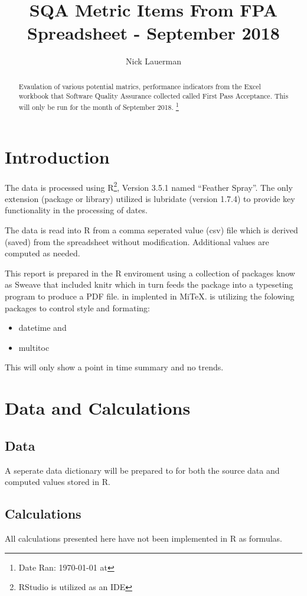 \documentclass{article}
\title{SQA Metric Items From FPA Spreadsheet - September 2018}
\author{Nick Lauerman}
\date{}
\begin{document}

\maketitle

\begin{abstract}
Evaulation of various potential matrics, performance indicators from the Excel
workbook that Software Quality Assurance collected called First Pass
Acceptance. This will only be run for the month of September 2018.
\footnote{Date Ran: \today{} at \currenttime}
\end{abstract}

\tableofcontents

\section{Introduction}
The data is processed using R\footnote{RStudio is utilized as an IDE}, Version
3.5.1 named ``Feather Spray''. The only extension (package or library) utilized is
lubridate (version 1.7.4) to provide key functionality in the processing of dates.

The data is read into R from a comma seperated value (csv) file which is derived (saved)
from the spreadsheet without modification. Additional values are computed as needed.

This report is prepared in the R enviroment using a collection of packages know as
Sweave that included knitr which in turn feeds the package into \LaTeXe{} a typeseting
program to produce a PDF file. \LaTeXe{} in implented in Mi\TeX. \LaTeXe{} is utilizing
the folowing packages to control style and formating:
\begin{itemize}
\item datetime and
\item multitoc
\end{itemize}

This will only show a point in time summary and no trends.

\section{Data and Calculations}
\subsection{Data}
A seperate data dictionary will be prepared to for both the source data
and computed values stored in R.

\subsection{Calculations}
All calculations presented here have not been implemented in R as formulas.
\end{document}
